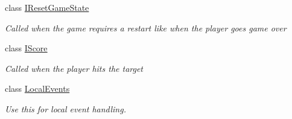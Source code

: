 \begin{DoxyCompactItemize}
\item 
class \hyperlink{class_events_1_1_i_reset_game_state}{I\+Reset\+Game\+State}
\begin{DoxyCompactList}\small\item\em Called when the game requires a restart like when the player goes game over \end{DoxyCompactList}\item 
class \hyperlink{class_events_1_1_i_score}{I\+Score}
\begin{DoxyCompactList}\small\item\em Called when the player hits the target \end{DoxyCompactList}\item 
class \hyperlink{class_events_1_1_local_events}{Local\+Events}
\begin{DoxyCompactList}\small\item\em Use this for local event handling. \end{DoxyCompactList}\end{DoxyCompactItemize}
